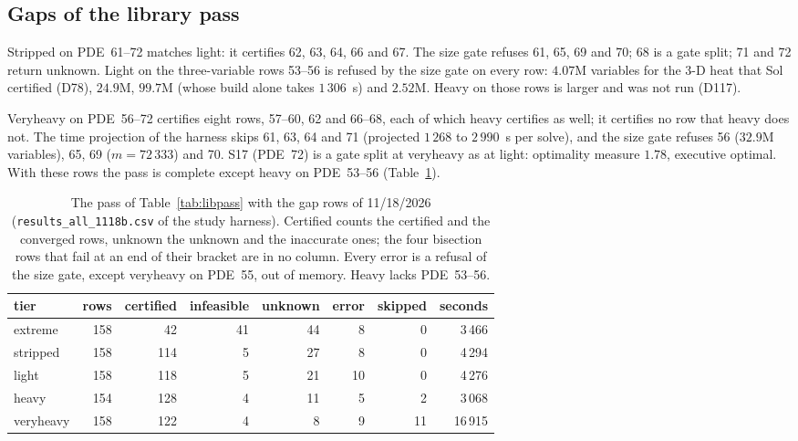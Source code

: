 \subsection{Gaps of the library pass}\label{sec:st-gaps}

Stripped on PDE~61--72 matches light: it certifies 62, 63, 64, 66 and 67. The size gate refuses 61, 65, 69 and 70; 68 is a gate split; 71 and 72 return unknown. Light on the three-variable rows 53--56 is refused by the size gate on every row: $4.07$M variables for the 3-D heat that Sol certified (D78), $24.9$M, $99.7$M (whose build alone takes $1\,306$~s) and $2.52$M. Heavy on those rows is larger and was not run (D117).

Veryheavy on PDE~56--72 certifies eight rows, 57--60, 62 and 66--68, each of which heavy certifies as well; it certifies no row that heavy does not. The time projection of the harness skips 61, 63, 64 and 71 (projected $1\,268$ to $2\,990$~s per solve), and the size gate refuses 56 ($32.9$M variables), 65, 69 ($m=72\,333$) and 70. S17 (PDE~72) is a gate split at veryheavy as at light: optimality measure $1.78$, executive optimal. With these rows the pass is complete except heavy on PDE~53--56 (Table~\ref{tab:st-pass}).

\begin{table}[h]\centering\footnotesize
\setlength{\tabcolsep}{4pt}
\begin{tabular}{lrrrrrrr}
\toprule
tier & rows & certified & infeasible & unknown & error & skipped & seconds \\
\midrule
extreme & 158 & 42 & 41 & 44 & 8 & 0 & 3\,466 \\
stripped & 158 & 114 & 5 & 27 & 8 & 0 & 4\,294 \\
light & 158 & 118 & 5 & 21 & 10 & 0 & 4\,276 \\
heavy & 154 & 128 & 4 & 11 & 5 & 2 & 3\,068 \\
veryheavy & 158 & 122 & 4 & 8 & 9 & 11 & 16\,915 \\
\bottomrule
\end{tabular}
\caption{The pass of Table~\ref{tab:libpass} with the gap rows of 11/18/2026 (\texttt{results\_all\_1118b.csv} of the study harness). Certified counts the certified and the converged rows, unknown the unknown and the inaccurate ones; the four bisection rows that fail at an end of their bracket are in no column. Every error is a refusal of the size gate, except veryheavy on PDE~55, out of memory. Heavy lacks PDE~53--56.}\label{tab:st-pass}
\end{table}

